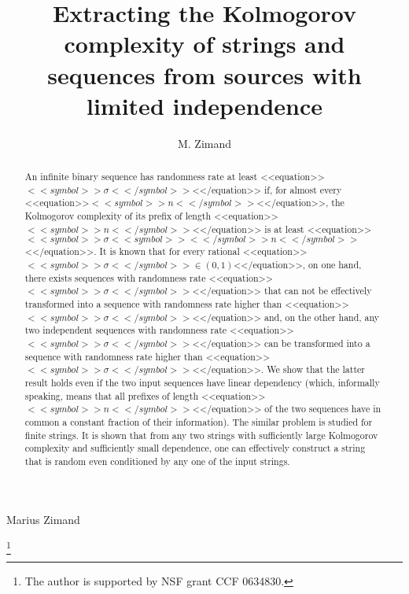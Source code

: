 \documentclass[proceedings]{stacs}
\begin{document}
\title[Extracting Kolmogorov complexity]{Extracting the Kolmogorov complexity of strings and sequences from sources with limited independence}

\author[Towson]{M. Zimand}{Marius Zimand}
\address[Towson]{Department of Computer and Information Sciences
  \newline Towson University}  %
\thanks{The author is supported by NSF grant CCF 0634830.}



\begin{abstract} 
An infinite binary sequence has randomness rate at least <<equation>>$<<symbol>>\sigma<</symbol>>$<</equation>> if, for almost every <<equation>>$<<symbol>>n<</symbol>>$<</equation>>, the Kolmogorov complexity of its prefix of length <<equation>>$<<symbol>>n<</symbol>>$<</equation>> is at least <<equation>>$<<symbol>>\sigma <<symbol>><</symbol>>n<</symbol>>$<</equation>>. It is known that for every rational <<equation>>$<<symbol>>\sigma <</symbol>>\in (0,1)$<</equation>>, on one hand,  there exists sequences with randomness rate <<equation>>$<<symbol>>\sigma<</symbol>>$<</equation>>  that can not  be effectively transformed into a sequence with randomness rate higher than <<equation>>$<<symbol>>\sigma<</symbol>>$<</equation>> and, on the other hand, any two independent sequences with randomness rate <<equation>>$<<symbol>>\sigma<</symbol>>$<</equation>> can be transformed into a sequence with randomness rate higher than <<equation>>$<<symbol>>\sigma<</symbol>>$<</equation>>. We show that the latter result holds even if the two input sequences have linear dependency (which, informally speaking, means that all prefixes of length <<equation>>$<<symbol>>n<</symbol>>$<</equation>> of the two sequences have in common a constant fraction of their information).  The similar problem is studied for finite strings. It is shown that from any two strings with sufficiently large Kolmogorov complexity and sufficiently small dependence, one can effectively construct a string that is random even conditioned by any one of the input strings.
\end{abstract}



\maketitle
\end{document}
